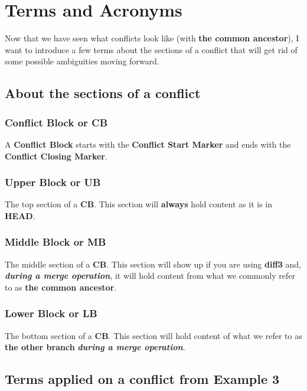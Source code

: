 
\section{Terms and Acronyms}

Now that we have seen what conflicts look like (with {\bf the common ancestor}), I want to introduce a few terms about
the sections of a conflict that will get rid of some possible ambiguities moving forward.

\subsection{About the sections of a conflict}

\subsubsection{Conflict Block or CB}
A {\bf Conflict Block} starts with the {\bf Conflict Start Marker} and ends with the {\bf Conflict Closing Marker}.

\subsubsection{Upper Block or UB}
The top section of a {\bf CB}. This section will {\bf always} hold content as it is in {\bf HEAD}.

\subsubsection{Middle Block or MB}
The middle section of a {\bf CB}. This section will show up if you are using {\bf diff3} and,
{\bf\it during a merge operation}, it will hold content from what we commonly refer to as {\bf the common ancestor}.

\subsubsection{Lower Block or LB}
The bottom section of a {\bf CB}. This section will hold content of what we refer to as {\bf the other branch}
{\bf\it during a merge operation}.

\subsection{Terms applied on a conflict from Example 3}

